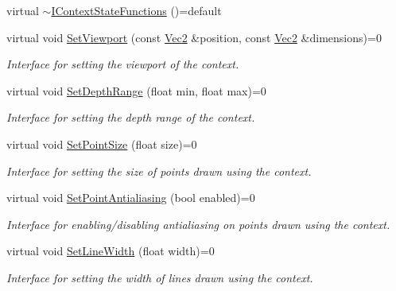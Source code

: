 \begin{DoxyCompactItemize}
\item 
virtual \hyperlink{class_g_f_w_1_1_i_context_state_functions_aa724020f7b666ca6639372161c1c3bb7}{$\sim$\+I\+Context\+State\+Functions} ()=default
\item 
virtual void \hyperlink{class_g_f_w_1_1_i_context_state_functions_a5fc1831a8590f1fca92ed86537d6a480}{Set\+Viewport} (const \hyperlink{namespace_g_f_w_1_1_math_af5ba989006b289f1e575dd7a911c1521}{Vec2} \&position, const \hyperlink{namespace_g_f_w_1_1_math_af5ba989006b289f1e575dd7a911c1521}{Vec2} \&dimensions)=0
\begin{DoxyCompactList}\small\item\em Interface for setting the viewport of the context. \end{DoxyCompactList}\item 
virtual void \hyperlink{class_g_f_w_1_1_i_context_state_functions_aeaaf04605dbc74af5a0aa2e2e0e2c355}{Set\+Depth\+Range} (float min, float max)=0
\begin{DoxyCompactList}\small\item\em Interface for setting the depth range of the context. \end{DoxyCompactList}\item 
virtual void \hyperlink{class_g_f_w_1_1_i_context_state_functions_a768ba46c0b8f967f108fee6e5b806ee6}{Set\+Point\+Size} (float size)=0
\begin{DoxyCompactList}\small\item\em Interface for setting the size of points drawn using the context. \end{DoxyCompactList}\item 
virtual void \hyperlink{class_g_f_w_1_1_i_context_state_functions_aeac582c0988c75d86d980d61b669e498}{Set\+Point\+Antialiasing} (bool enabled)=0
\begin{DoxyCompactList}\small\item\em Interface for enabling/disabling antialiasing on points drawn using the context. \end{DoxyCompactList}\item 
virtual void \hyperlink{class_g_f_w_1_1_i_context_state_functions_af8e56351f681e1c3e82be854a650d2a0}{Set\+Line\+Width} (float width)=0
\begin{DoxyCompactList}\small\item\em Interface for setting the width of lines drawn using the context. \end{DoxyCompactList}\item 

\end{DoxyCompactItemize}
